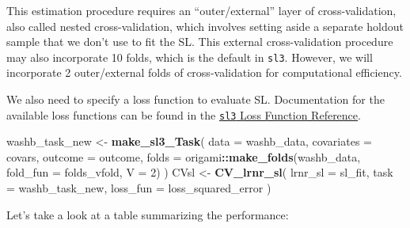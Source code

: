 \documentclass[12pt, krantz2,]{book}
\newenvironment{Shaded}{\begin{snugshade}}{\end{snugshade}}
\newcommand{\ControlFlowTok}[1]{\textcolor[rgb]{0.13,0.29,0.53}{\textbf{#1}}}
\newcommand{\DataTypeTok}[1]{\textcolor[rgb]{0.13,0.29,0.53}{#1}}
\newcommand{\DecValTok}[1]{\textcolor[rgb]{0.00,0.00,0.81}{#1}}
\newcommand{\KeywordTok}[1]{\textcolor[rgb]{0.13,0.29,0.53}{\textbf{#1}}}
\newcommand{\NormalTok}[1]{#1}
\newcommand{\OperatorTok}[1]{\textcolor[rgb]{0.81,0.36,0.00}{\textbf{#1}}}
\newcommand{\OtherTok}[1]{\textcolor[rgb]{0.56,0.35,0.01}{#1}}
\newcommand{\StringTok}[1]{\textcolor[rgb]{0.31,0.60,0.02}{#1}}
\theoremstyle{definition}
\theoremstyle{definition}
\theoremstyle{definition}
\newcommand{\1}{\mathbbm{1}}
\begin{document}
This estimation procedure requires an ``outer/external'' layer of
cross-validation, also called nested cross-validation, which involves setting
aside a separate holdout sample that we don't use to fit the SL. This external
cross-validation procedure may also incorporate 10 folds, which is the default
in \texttt{sl3}. However, we will incorporate 2 outer/external folds of
cross-validation for computational efficiency.

We also need to specify a loss function to evaluate SL. Documentation for the
available loss functions can be found in the \href{https://tlverse.org/sl3/reference/loss_functions.html}{\texttt{sl3} Loss
Function Reference}.

\begin{Shaded}
\begin{Highlighting}[]
\NormalTok{washb_task_new <-}\StringTok{ }\KeywordTok{make_sl3_Task}\NormalTok{(}
  \DataTypeTok{data =}\NormalTok{ washb_data,}
  \DataTypeTok{covariates =}\NormalTok{ covars,}
  \DataTypeTok{outcome =}\NormalTok{ outcome,}
  \DataTypeTok{folds =}\NormalTok{ origami}\OperatorTok{::}\KeywordTok{make_folds}\NormalTok{(washb_data, }\DataTypeTok{fold_fun =}\NormalTok{ folds_vfold, }\DataTypeTok{V =} \DecValTok{2}\NormalTok{)}
\NormalTok{)}
\NormalTok{CVsl <-}\StringTok{ }\KeywordTok{CV_lrnr_sl}\NormalTok{(}
  \DataTypeTok{lrnr_sl =}\NormalTok{ sl_fit, }\DataTypeTok{task =}\NormalTok{ washb_task_new, }\DataTypeTok{loss_fun =}\NormalTok{ loss_squared_error}
\NormalTok{)}
\end{Highlighting}
\end{Shaded}

Let's take a look at a table summarizing the performance:

\begin{Shaded}
\end{Shaded}
\end{document}
